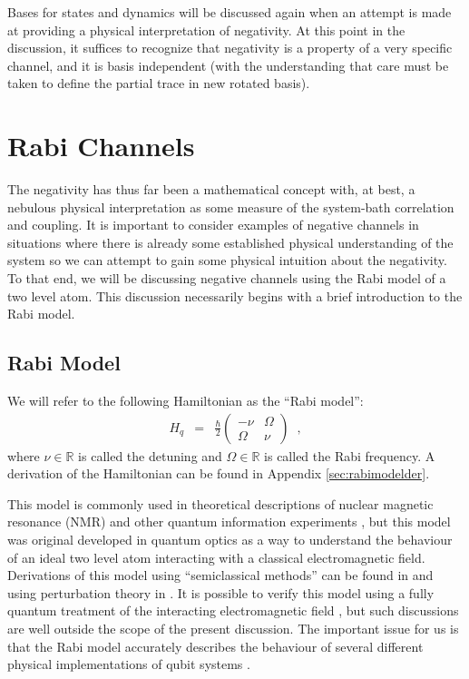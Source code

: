 Bases for states and dynamics will be discussed again when an attempt is made at providing a physical interpretation of negativity.  At this point in the discussion, it suffices to recognize that negativity is a property of a very specific channel, and it is basis independent (with the understanding that care must be taken to define the partial trace in new rotated basis).

\section{Rabi Channels}
\label{sec:rabi}

The negativity has thus far been a mathematical concept with, at best, a nebulous physical interpretation as some measure of the system-bath correlation and coupling.  It is important to consider examples of negative channels in situations where there is already some established physical understanding of the system so we can attempt to gain some physical intuition about the negativity.  To that end, we will be discussing negative channels using the Rabi model of a two level atom.  This discussion necessarily begins with a brief introduction to the Rabi model.

\subsection{Rabi Model}

We will refer to the following Hamiltonian as the ``Rabi model'':
\begin{eqnarray*}
H_q &=& \frac{\hbar}{2}\begin{pmatrix}
-\nu & \Omega\\
\Omega & \nu
\end{pmatrix}\;\;,
\end{eqnarray*}
where $\nu\in\mathbb{R}$ is called the detuning and $\Omega\in\mathbb{R}$ is called the Rabi frequency.  A derivation of the Hamiltonian can be found in Appendix \ref{sec:rabimodelder}.

This model is commonly used in theoretical descriptions of nuclear magnetic resonance (NMR) and other quantum information experiments \cite{Mikio2008}, but this model was original developed in quantum optics as a way to understand the behaviour of an ideal two level atom interacting with a classical electromagnetic field.  Derivations of this model using ``semiclassical methods'' can be found in \cite{Kok2010,Barnett2002,Mandel1995,Loudon2000} and using perturbation theory in \cite{Loudon2000,Orszag2008,Suter1997}.  It is possible to verify this model using a fully quantum treatment of the interacting electromagnetic field \cite{Barnett2002}, but such discussions are well outside the scope of the present discussion.  The important issue for us is that the Rabi model accurately describes the behaviour of several different physical implementations of qubit systems \cite{Mikio2008}.


